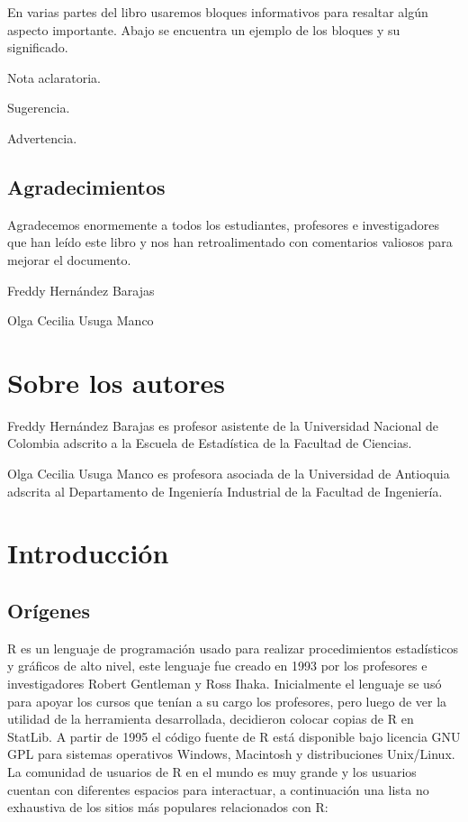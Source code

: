 \documentclass[10pt,]{krantz}
\let\proglang=\textsf
\let\BeginKnitrBlock\begin \let\EndKnitrBlock\end
\begin{document}
En varias partes del libro usaremos bloques informativos para resaltar
algún aspecto importante. Abajo se encuentra un ejemplo de los bloques y
su significado.

\BeginKnitrBlock{rmdnote}
Nota aclaratoria.
\EndKnitrBlock{rmdnote}

\BeginKnitrBlock{rmdtip}
Sugerencia.
\EndKnitrBlock{rmdtip}

\BeginKnitrBlock{rmdwarning}
Advertencia.
\EndKnitrBlock{rmdwarning}

\section*{Agradecimientos}\label{agradecimientos}


Agradecemos enormemente a todos los estudiantes, profesores e
investigadores que han leído este libro y nos han retroalimentado con
comentarios valiosos para mejorar el documento.

\BeginKnitrBlock{flushright}
Freddy Hernández Barajas

Olga Cecilia Usuga Manco
\EndKnitrBlock{flushright}

\chapter*{Sobre los autores}\label{sobre-los-autores}


Freddy Hernández Barajas es profesor asistente de la Universidad
Nacional de Colombia adscrito a la Escuela de Estadística de la Facultad
de Ciencias.

Olga Cecilia Usuga Manco es profesora asociada de la Universidad de
Antioquia adscrita al Departamento de Ingeniería Industrial de la
Facultad de Ingeniería.

\mainmatter

\chapter{Introducción}\label{introduccion}

\section{Orígenes} \label{sec:origenes}

\proglang{R} es un lenguaje de programación usado para realizar
procedimientos estadísticos y gráficos de alto nivel, este lenguaje fue
creado en 1993 por los profesores e investigadores Robert Gentleman y
Ross Ihaka. Inicialmente el lenguaje se usó para apoyar los cursos que
tenían a su cargo los profesores, pero luego de ver la utilidad de la
herramienta desarrollada, decidieron colocar copias de \proglang{R} en
StatLib. A partir de 1995 el código fuente de \proglang{R} está
disponible bajo licencia GNU GPL para sistemas operativos Windows,
Macintosh y distribuciones Unix/Linux. La comunidad de usuarios de
\proglang{R} en el mundo es muy grande y los usuarios cuentan con
diferentes espacios para interactuar, a continuación una lista no
exhaustiva de los sitios más populares relacionados con \proglang{R}:
\end{document}

